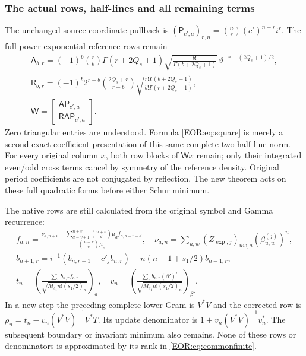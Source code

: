 \documentclass[11pt,a4paper]{article}
\begin{document}
\subsubsection{The actual rows, half-lines and all remaining terms}
The unchanged source-coordinate pullback is
$(\mathsf P_{c',a})_{r,n}=\binom nr(c')^{n-r}i^r$.
The full power-exponential reference rows remain
\begin{equation}
\begin{gathered}
 \mathsf A_{b,r}=(-1)^b\binom rb\Gamma(r+2Q_s+1)
 \sqrt{\frac{b!}{\Gamma(b+2Q_s+1)}}\,
 \vartheta^{-r-(2Q_s+1)/2},\\
 \mathsf R_{b,r}=(-1)^b2^{r-b}\binom{2Q_s+r}{r-b}
 \sqrt{\frac{r!\Gamma(b+2Q_s+1)}{b!\Gamma(r+2Q_s+1)}},\\
 \mathsf W=\begin{bmatrix}\mathsf A\mathsf P_{c',a}\\
                           \mathsf R\mathsf A\mathsf P_{c',a}\end{bmatrix}.
\end{gathered}\label{EOR:eq:W}
\tag{EOR30}
\end{equation}
Zero triangular entries are understood. Formula \eqref{EOR:eq:square} is merely a
second exact coefficient presentation of this same complete two-half-line norm.
For every original column $x$, both row blocks of $\mathsf Wx$ remain; only their
integrated even/odd cross terms cancel by symmetry of the reference density.
Original period coefficients are not conjugated by reflection.
The new theorem acts on these full quadratic forms before either Schur minimum.

The native rows are still calculated from the original symbol and Gamma recurrence:
\begin{equation}
\begin{gathered}
 f_{a,n}=\frac{\nu_{a,n+v}-\sum_{d=v+1}^{n+v}\binom{n+v}{d}
               \mu_df_{a,n+v-d}}{\binom{n+v}{v}\mu_v},\quad
 \nu_{a,n}=\sum_{u,w}(Z_{\exp,j})_{uw,a}(\beta_{u,w}^{(j)})^n,\\
 b_{n+1,r}=i^{-1}(b_{n,r-1}-c'_jb_{n,r})
                 -n(n-1+s_1/2)b_{n-1,r},\\
 t_n=\left(\frac{\sum_r b_{n,r}f_{a,r}}{\sqrt{M_{s_1}n!(s_1/2)_n}}\right)_a,
 \quad
 v_n=\left(\frac{\sum_r b_{n,r}(\beta')^r}{\sqrt{M_{s_1}n!(s_1/2)_n}}\right)_{\beta'}.
\end{gathered}\label{EOR:eq:rows}
\tag{EOR31}
\end{equation}
In a new step the preceding complete lower Gram is $V^*V$ and the corrected row
is $\rho_n=t_n-v_n(V^*V)^{-1}V^*T$.
Its update denominator is $1+v_n(V^*V)^{-1}v_n^*$.
The subsequent boundary or invariant minimum also remains. None of these rows
or denominators is approximated by its rank in \eqref{EOR:eq:commonfinite}.
\end{document}
